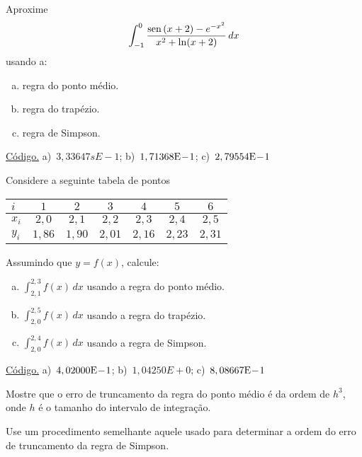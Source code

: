 \begin{exer}\label{exer:int_NC_fun}
  Aproxime
  \begin{equation}
    \int_{-1}^0 \frac{\operatorname{sen}\,(x+2)-e^{-x^2}}{x^2+\ln(x+2)}\,dx
  \end{equation}
usando a:
\begin{enumerate}[a)]
\item regra do ponto médio.
\item regra do trapézio.
\item regra de Simpson.
\end{enumerate}
\end{exer}
\begin{resp}
  \ifisoctave 
  \href{https://github.com/phkonzen/notas/blob/master/src/MatematicaNumerica/cap_integr/dados/exer_int_NC_fun/exer_int_NC_fun.m}{Código.} 
  \fi
  a)~$3,33647sE-1$; b)~$1,71368\mathrm{E}\!-\!1$; c)~$2,79554\mathrm{E}\!-\!1$
\end{resp}

\begin{exer}\label{exer:int_NC_tab}
  Considere a seguinte tabela de pontos
  \begin{center}
    \begin{tabular}{l|cccccc}
      $i$ & $1$ & $2$ & $3$ & $4$ & $5$ & $6$ \\\hline
      $x_i$ & $2,0$ & $2,1$ & $2,2$ & $2,3$ & $2,4$ & $2,5$ \\
      $y_i$ & $1,86$ & $1,90$ & $2,01$ & $2,16$ & $2,23$ & $2,31$ \\\hline
    \end{tabular}
  \end{center}
Assumindo que $y = f(x)$, calcule:
\begin{enumerate}[a)]
\item $\displaystyle \int_{2,1}^{2,3} f(x)\,dx$ usando a regra do ponto médio.
\item $\displaystyle \int_{2,0}^{2,5} f(x)\,dx$ usando a regra do trapézio.
\item $\displaystyle \int_{2,0}^{2,4} f(x)\,dx$ usando a regra de Simpson.
\end{enumerate}
\end{exer}
\begin{resp}
  \ifisoctave 
  \href{https://github.com/phkonzen/notas/blob/master/src/MatematicaNumerica/cap_integr/dados/exer_int_NC_tab/exer_int_NC_tab.m}{Código.} 
  \fi
  a)~$4,02000\mathrm{E}\!-\!1$; b)~$1,04250E+0$; c)~$8,08667\mathrm{E}\!-\!1$
\end{resp}

\begin{exer}\label{exer:trunc_pto_medio}
  Mostre que o erro de truncamento da regra do ponto médio é da ordem de $h^3$, onde $h$ é o tamanho do intervalo de integração.
\end{exer}
\begin{resp}
  Use um procedimento semelhante aquele usado para determinar a ordem do erro de truncamento da regra de Simpson.
\end{resp}

